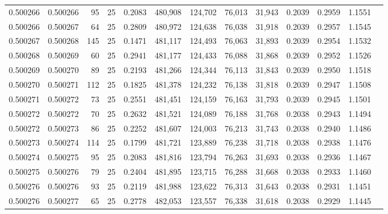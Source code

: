 \begin{tabular}{rrrrrrrrrrrrr}
0.500266 & 0.500266 &  95 &  25 &                                     0.2083 & 480,908 & 124,702 &  76,013 &  31,943 & 0.2039 & 0.2959 & 1.1551 \\
0.500266 & 0.500267 &  64 &  25 &                                     0.2809 & 480,972 & 124,638 &  76,038 &  31,918 & 0.2039 & 0.2957 & 1.1545 \\
0.500267 & 0.500268 & 145 &  25 &                                     0.1471 & 481,117 & 124,493 &  76,063 &  31,893 & 0.2039 & 0.2954 & 1.1532 \\
0.500268 & 0.500269 &  60 &  25 &                                     0.2941 & 481,177 & 124,433 &  76,088 &  31,868 & 0.2039 & 0.2952 & 1.1526 \\
0.500269 & 0.500270 &  89 &  25 &                                     0.2193 & 481,266 & 124,344 &  76,113 &  31,843 & 0.2039 & 0.2950 & 1.1518 \\
0.500270 & 0.500271 & 112 &  25 &                                     0.1825 & 481,378 & 124,232 &  76,138 &  31,818 & 0.2039 & 0.2947 & 1.1508 \\
0.500271 & 0.500272 &  73 &  25 &                                     0.2551 & 481,451 & 124,159 &  76,163 &  31,793 & 0.2039 & 0.2945 & 1.1501 \\
0.500272 & 0.500272 &  70 &  25 &                                     0.2632 & 481,521 & 124,089 &  76,188 &  31,768 & 0.2038 & 0.2943 & 1.1494 \\
0.500272 & 0.500273 &  86 &  25 &                                     0.2252 & 481,607 & 124,003 &  76,213 &  31,743 & 0.2038 & 0.2940 & 1.1486 \\
0.500273 & 0.500274 & 114 &  25 &                                     0.1799 & 481,721 & 123,889 &  76,238 &  31,718 & 0.2038 & 0.2938 & 1.1476 \\
0.500274 & 0.500275 &  95 &  25 &                                     0.2083 & 481,816 & 123,794 &  76,263 &  31,693 & 0.2038 & 0.2936 & 1.1467 \\
0.500275 & 0.500276 &  79 &  25 &                                     0.2404 & 481,895 & 123,715 &  76,288 &  31,668 & 0.2038 & 0.2933 & 1.1460 \\
0.500276 & 0.500276 &  93 &  25 &                                     0.2119 & 481,988 & 123,622 &  76,313 &  31,643 & 0.2038 & 0.2931 & 1.1451 \\
0.500276 & 0.500277 &  65 &  25 &                                     0.2778 & 482,053 & 123,557 &  76,338 &  31,618 & 0.2038 & 0.2929 & 1.1445 \\

\end{tabular}
